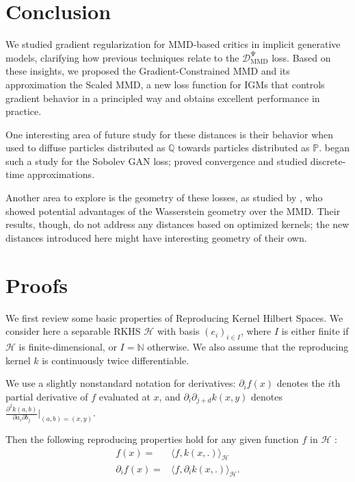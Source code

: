 \documentclass{article}
\newcommand{\h}{\mathcal H}
\newcommand{\PP}{\mathbb P}
\newcommand{\QQ}{\mathbb Q}
\newcommand{\optMMD}[1][\Psi]{\operatorname{\mathcal D_{\mathrm{MMD}}^{#1}}}
\let\citep\parencite
\begin{document}
\section{Conclusion}
We studied gradient regularization for MMD-based critics in implicit generative models,
clarifying how previous techniques relate to the $\optMMD$ loss.
Based on these insights,
we proposed the Gradient-Constrained MMD and its approximation the Scaled MMD,
a new loss function for IGMs that controls gradient behavior in a principled way
and obtains excellent performance in practice.

One interesting area of future study for these distances is their behavior
when used to diffuse particles distributed as $\QQ$ towards particles distributed as $\PP$.
\Textcite[Appendix A.1]{sobolev-gan} began such a study for the Sobolev GAN loss; \cite{sobolev-descent} proved convergence and studied discrete-time approximations.

Another area to explore is the geometry of these losses,
as studied by \textcite{Bottou:2017},
who showed potential advantages of the Wasserstein geometry over the MMD.
Their results, though, do not address any distances based on optimized kernels;
the new distances introduced here
might have interesting geometry of their own.



\printbibliography

\clearpage
\appendix



\section{Proofs} \label{appendix:proofs}

We first review some basic properties of Reproducing Kernel Hilbert
Spaces. We consider here a separable RKHS $\h$ with basis $(e_{i})_{i\in I}$,
where $I$ is either finite if $\h$ is finite-dimensional, or $I=\mathbb{N}$
otherwise. We also assume that the reproducing kernel $k$ is continuously
twice differentiable.

We use a slightly nonstandard notation for derivatives:
$\partial_i f(x)$ denotes the $i$th partial derivative of $f$ evaluated at $x$,
and $\partial_i \partial_{j+d} k(x, y)$
denotes $\frac{\partial^2 k(a, b)}{\partial a_i \partial b_j} \vert_{(a,b) = (x, y)}$.

Then the following reproducing properties hold for
any given function $f$ in $\h$ \citep[Lemma 4.34]{SteChr08}:
\begin{align}
f(x)= & \langle f,k(x,.)\rangle_{\h}\label{eq:reproducing_prop}\\
\partial_{i}f(x)= & \langle f,\partial_{i}k(x,.)\rangle_{\h}\label{eq:reproducing_derivative}
.\end{align}
\end{document}

